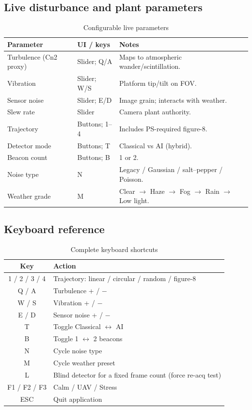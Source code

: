 \documentclass[11pt,a4paper]{article}
\begin{document}
\subsection{Live disturbance and plant parameters}
\begin{table}[H]
\centering
\caption{Configurable live parameters}
\label{tab:params}
\small
\begin{tabular}{@{}p{3.6cm}p{3.4cm}p{6.5cm}@{}}
\toprule
\textbf{Parameter} & \textbf{UI / keys} & \textbf{Notes} \\
\midrule
Turbulence (Cn2 proxy) & Slider; Q/A & Maps to atmospheric wander/scintillation. \\
Vibration & Slider; W/S & Platform tip/tilt on FOV. \\
Sensor noise & Slider; E/D & Image grain; interacts with weather. \\
Slew rate & Slider & Camera plant authority. \\
Trajectory & Buttons; 1--4 & Includes PS-required figure-8. \\
Detector mode & Buttons; T & Classical vs AI (hybrid). \\
Beacon count & Buttons; B & 1 or 2. \\
Noise type & N & Legacy / Gaussian / salt--pepper / Poisson. \\
Weather grade & M & Clear $\rightarrow$ Haze $\rightarrow$ Fog $\rightarrow$ Rain $\rightarrow$ Low light. \\
\bottomrule
\end{tabular}
\end{table}

\subsection{Keyboard reference}
\begin{table}[H]
\centering
\caption{Complete keyboard shortcuts}
\label{tab:keys}
\small
\begin{tabular}{@{}cl@{}}
\toprule
\textbf{Key} & \textbf{Action} \\
\midrule
1 / 2 / 3 / 4 & Trajectory: linear / circular / random / figure-8 \\
Q / A & Turbulence + / $-$ \\
W / S & Vibration + / $-$ \\
E / D & Sensor noise + / $-$ \\
T & Toggle Classical $\leftrightarrow$ AI \\
B & Toggle 1 $\leftrightarrow$ 2 beacons \\
N & Cycle noise type \\
M & Cycle weather preset \\
L & Blind detector for a fixed frame count (force re-acq test) \\
F1 / F2 / F3 & Calm / UAV / Stress \\
ESC & Quit application \\
\bottomrule
\end{tabular}
\end{table}
\end{document}
